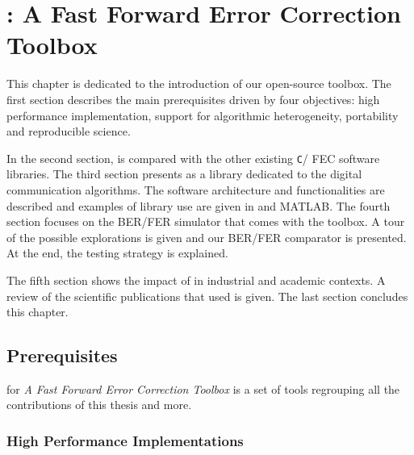 
\renewcommand{\curChapter}{main/chapter3}

\chapter{\AFFECT: A Fast Forward Error Correction Toolbox}
\label{chap:aff3ct}

This chapter is dedicated to the introduction of our \AFFECT open-source
toolbox. The first section describes the main prerequisites driven by four
objectives: high performance implementation, support for algorithmic
heterogeneity, portability and reproducible science.

In the second section, \AFFECT is compared with the other existing \verb|C|/\Cxx
FEC software libraries. The third section presents \AFFECT as a library
dedicated to the digital communication algorithms. The software architecture and
functionalities are described and examples of library use are given in \Cxx and
MATLAB. The fourth section focuses on the \AFFECT BER/FER simulator that comes
with the toolbox. A tour of the possible explorations is given and our BER/FER
comparator is presented. At the end, the \AFFECT testing strategy is explained.

The fifth section shows the impact of \AFFECT in industrial and academic
contexts. A review of the scientific publications that used \AFFECT is given.
The last section concludes this chapter.

\vspace*{\fill}
\minitoccustom
\vspace*{\fill}

\newpage
\section{Prerequisites}

\AFFECT for \emph{A Fast Forward Error Correction Toolbox} is a set of tools
regrouping all the contributions of this thesis and more.

\subsection{High Performance Implementations}

